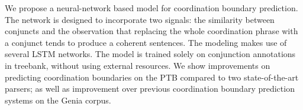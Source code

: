 We propose a neural-network based model for coordination boundary prediction. The network is designed to incorporate two signals: the similarity between conjuncts and the observation that replacing the whole coordination phrase with a conjunct tends to produce a coherent sentences. The modeling makes use of several LSTM networks. The model is trained solely on conjunction annotations in treebank, without using external resources. We show improvements on predicting coordination boundaries on the PTB compared to two state-of-the-art parsers; as well as improvement over previous coordination boundary prediction systems on the Genia corpus.
